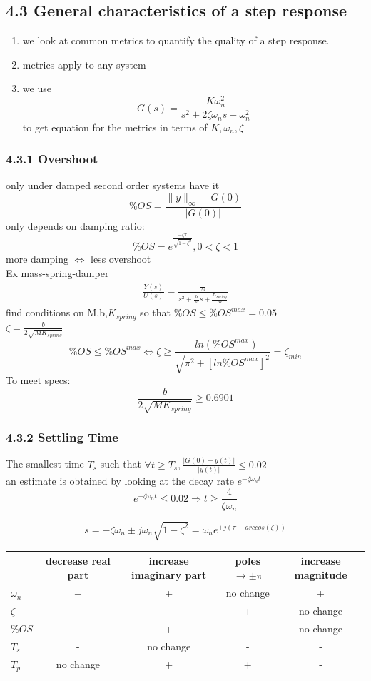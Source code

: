 \documentclass[letterpaper]{article}
\begin{document}
	\subsection*{4.3 General characteristics of a step response}
	\begin{enumerate}
		\item we look at common metrics to quantify the quality of a step response.
		\item metrics apply to any system
		\item we use $$G(s)=\frac{K\omega_n^2}{s^2+2\zeta\omega_n s+\omega_n^2}$$ to get equation for the metrics in terms of $K,\omega_n,\zeta$
	\end{enumerate}		
	\subsubsection*{4.3.1 Overshoot}
	only under damped second order systems have it
	$$\%OS=\frac{\|y\|_\infty-G(0)}{|G(0)|}$$
	only depends on damping ratio:
	$$\%OS=e^{\frac{-\zeta\pi}{\sqrt{1-\zeta^2}}},0<\zeta<1$$
	more damping $\Leftrightarrow$ less overshoot\\
			
	Ex mass-spring-damper\\
	\begin{align*}
		\frac{Y(s)}{U(s)}=\frac{\frac{1}{M}}{s^2+\frac{b}{M}s+\frac{K_{spring}}{M}} 
	\end{align*}
	find conditions on M,b,$K_{spring}$ so that $\%OS\leq \%OS^{max}=0.05$\\
	$\zeta=\frac{b}{2\sqrt{MK_{spring}}}$		
	$$\%OS\leq \%OS^{max}\Leftrightarrow \zeta \geq \frac{-ln(\%OS^{max})}{\sqrt{\pi^2+[ln\%OS^{max}]^2}}=\zeta_{min}$$
	To meet specs: $$\frac{b}{2\sqrt{MK_{spring}}}\geq 0.6901$$
	\subsubsection*{4.3.2 Settling Time}
	The smallest time $T_s$ such that $\forall t\geq T_s, \frac{|G(0)-y(t)|}{|y(t)|}\leq 0.02$\\
	an estimate is obtained by looking at the decay rate $e^{-\zeta\omega_n t}$
	$$e^{-\zeta\omega_n t}\leq 0.02 \Rightarrow t\geq \frac{4}{\zeta\omega_n}$$ 
			
	$$s=-\zeta\omega_n \pm j\omega_n\sqrt{1-\zeta^2}=\omega_n e^{\pm j(\pi-arccos(\zeta))}$$		
	\begin{center}
		\begin{tabular}{ l | c | c | c | c }
			  & decrease real part & increase imaginary part & poles $\rightarrow \pm \pi$ & increase magnitude \\ \hline
			$\omega_n$ & + & + & no change & + \\ \hline
			$\zeta$ & + & - & + & no change\\ \hline
			$\%OS$ & - & + & - & no change\\ \hline
			$T_s$ & - & no change & - & -\\ \hline
			$T_p$ & no change & + & + & -\\ 
		\end{tabular}
	\end{center}
			
\end{document}
